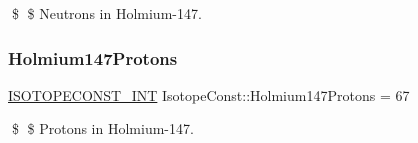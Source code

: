 \$ \$ Neutrons in Holmium-\/147. \mbox{\label{group___isotope_const-_holmium-_ho147_ga9b701e30b1f14a1871ccde8a536b0438}} 
\subsubsection{\texorpdfstring{Holmium147\+Protons}{Holmium147Protons}}
{\footnotesize\ttfamily \mbox{\hyperlink{group___isotope_const-_macros_ga5f18360b3e99483a35c32d789e62621c}{I\+S\+O\+T\+O\+P\+E\+C\+O\+N\+S\+T\+\_\+\+I\+NT}} Isotope\+Const\+::\+Holmium147\+Protons = 67}

\$ \$ Protons in Holmium-\/147. 